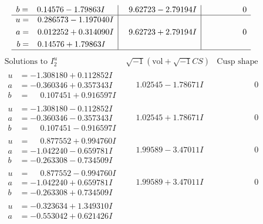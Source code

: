 \documentclass[1p]{elsarticle_modified}
\theoremstyle{definition}
\newcommand{\I}{\sqrt{-1}}
\begin{document}
$$\begin{array}{c|c|c}
\begin{aligned}
b &= \phantom{-}0.14576 - 1.79863 I\end{aligned}
 & \phantom{-}9.62723 - 2.79194 I & \phantom{-0.000000 } 0 \\ \hline\begin{aligned}
u &= \phantom{-}0.286573 - 1.197040 I \\
a &= \phantom{-}0.012252 + 0.314090 I \\
b &= \phantom{-}0.14576 + 1.79863 I\end{aligned}
 & \phantom{-}9.62723 + 2.79194 I & \phantom{-0.000000 } 0\\
 \hline 
 \end{array}$$\newpage$$\begin{array}{c|c|c}  
\text{Solutions to }I^u_{2}& \I (\text{vol} + \sqrt{-1}CS) & \text{Cusp shape}\\
 \hline 
\begin{aligned}
u &= -1.308180 + 0.112852 I \\
a &= -0.360346 + 0.357343 I \\
b &= \phantom{-}0.107451 + 0.916597 I\end{aligned}
 & \phantom{-}1.02545 - 1.78671 I & \phantom{-0.000000 } 0 \\ \hline\begin{aligned}
u &= -1.308180 - 0.112852 I \\
a &= -0.360346 - 0.357343 I \\
b &= \phantom{-}0.107451 - 0.916597 I\end{aligned}
 & \phantom{-}1.02545 + 1.78671 I & \phantom{-0.000000 } 0 \\ \hline\begin{aligned}
u &= \phantom{-}0.877552 + 0.994760 I \\
a &= -1.042240 - 0.659781 I \\
b &= -0.263308 - 0.734509 I\end{aligned}
 & \phantom{-}1.99589 - 3.47011 I & \phantom{-0.000000 } 0 \\ \hline\begin{aligned}
u &= \phantom{-}0.877552 - 0.994760 I \\
a &= -1.042240 + 0.659781 I \\
b &= -0.263308 + 0.734509 I\end{aligned}
 & \phantom{-}1.99589 + 3.47011 I & \phantom{-0.000000 } 0 \\ \hline\begin{aligned}
u &= -0.323634 + 1.349310 I \\
a &= -0.553042 + 0.621426 I \\

\end{aligned}
\end{array}$$
\end{document}
